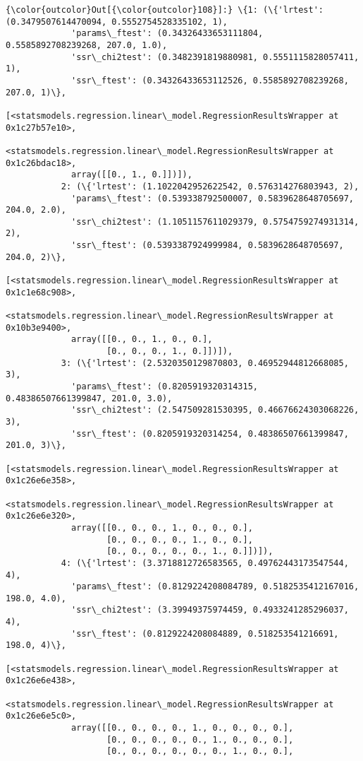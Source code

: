 \documentclass[11pt]{article}
\begin{document}
\begin{Verbatim}[commandchars=\\\{\}]
{\color{outcolor}Out[{\color{outcolor}108}]:} \{1: (\{'lrtest': (0.3479507614470094, 0.5552754528335102, 1),
             'params\_ftest': (0.34326433653111804, 0.5585892708239268, 207.0, 1.0),
             'ssr\_chi2test': (0.3482391819880981, 0.5551115828057411, 1),
             'ssr\_ftest': (0.34326433653112526, 0.5585892708239268, 207.0, 1)\},
            [<statsmodels.regression.linear\_model.RegressionResultsWrapper at 0x1c27b57e10>,
             <statsmodels.regression.linear\_model.RegressionResultsWrapper at 0x1c26bdac18>,
             array([[0., 1., 0.]])]),
           2: (\{'lrtest': (1.1022042952622542, 0.576314276803943, 2),
             'params\_ftest': (0.539338792500007, 0.5839628648705697, 204.0, 2.0),
             'ssr\_chi2test': (1.1051157611029379, 0.5754759274931314, 2),
             'ssr\_ftest': (0.5393387924999984, 0.5839628648705697, 204.0, 2)\},
            [<statsmodels.regression.linear\_model.RegressionResultsWrapper at 0x1c1e68c908>,
             <statsmodels.regression.linear\_model.RegressionResultsWrapper at 0x10b3e9400>,
             array([[0., 0., 1., 0., 0.],
                    [0., 0., 0., 1., 0.]])]),
           3: (\{'lrtest': (2.5320350129870803, 0.46952944812668085, 3),
             'params\_ftest': (0.8205919320314315, 0.48386507661399847, 201.0, 3.0),
             'ssr\_chi2test': (2.547509281530395, 0.46676624303068226, 3),
             'ssr\_ftest': (0.8205919320314254, 0.48386507661399847, 201.0, 3)\},
            [<statsmodels.regression.linear\_model.RegressionResultsWrapper at 0x1c26e6e358>,
             <statsmodels.regression.linear\_model.RegressionResultsWrapper at 0x1c26e6e320>,
             array([[0., 0., 0., 1., 0., 0., 0.],
                    [0., 0., 0., 0., 1., 0., 0.],
                    [0., 0., 0., 0., 0., 1., 0.]])]),
           4: (\{'lrtest': (3.3718812726583565, 0.49762443173547544, 4),
             'params\_ftest': (0.8129224208084789, 0.5182535412167016, 198.0, 4.0),
             'ssr\_chi2test': (3.39949375974459, 0.4933241285296037, 4),
             'ssr\_ftest': (0.8129224208084889, 0.518253541216691, 198.0, 4)\},
            [<statsmodels.regression.linear\_model.RegressionResultsWrapper at 0x1c26e6e438>,
             <statsmodels.regression.linear\_model.RegressionResultsWrapper at 0x1c26e6e5c0>,
             array([[0., 0., 0., 0., 1., 0., 0., 0., 0.],
                    [0., 0., 0., 0., 0., 1., 0., 0., 0.],
                    [0., 0., 0., 0., 0., 0., 1., 0., 0.],

\end{Verbatim}
\end{document}
